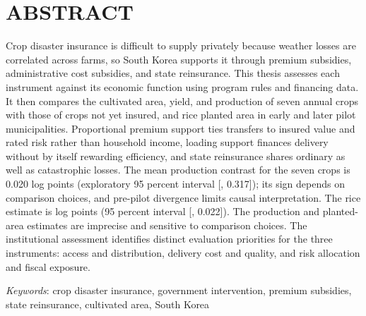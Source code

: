 \chapter*{ABSTRACT}

\begin{center}
\end{center}
\vspace{0.6cm}

Crop disaster insurance is difficult to supply privately because weather losses are correlated across farms, so South Korea supports it through premium subsidies, administrative cost subsidies, and state reinsurance. This thesis assesses each instrument against its economic function using program rules and financing data. It then compares the cultivated area, yield, and production of seven annual crops with those of crops not yet insured, and rice planted area in early and later pilot municipalities. Proportional premium support ties transfers to insured value and rated risk rather than household income, loading support finances delivery without by itself rewarding efficiency, and state reinsurance shares ordinary as well as catastrophic losses. The mean production contrast for the seven crops is 0.020 log points (exploratory 95 percent interval [, 0.317]); its sign depends on comparison choices, and pre-pilot divergence limits causal interpretation. The rice estimate is  log points (95 percent interval [, 0.022]). The production and planted-area estimates are imprecise and sensitive to comparison choices. The institutional assessment identifies distinct evaluation priorities for the three instruments: access and distribution, delivery cost and quality, and risk allocation and fiscal exposure.

\vspace{0.5cm}
\noindent\textit{Keywords}: crop disaster insurance, government intervention, premium subsidies, state reinsurance, cultivated area, South Korea
